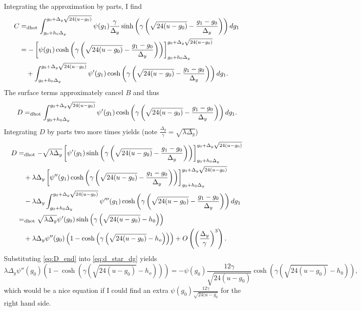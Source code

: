 \documentclass[twocolumn]{article}
\newcommand{\dhot}{=_{\text{dhot}}}
\begin{document}
Integrating the approximation by parts, I find
\begin{align*}
  C &\dhot \int_{\Lg}^{\Ug} \psi(g_1) \frac{\gamma}{\Delta_y}
  \sinh \left( \gamma \left(
      \sqrt{24(u-g_0)} - \frac{g_1 - g_0 }{ \Delta_y}
    \right) \right) dg_1 \\
  &= -\left[ \psi(g_1) \cosh \left( \gamma \left(
      \sqrt{24(u-g_0)} - \frac{g_1 - g_0 }{ \Delta_y}
    \right) \right)\right]_{\Lg}^{\Ug} \\
& \quad + \int_{\Lg}^{\Ug} \psi'(g_1) \cosh \left( \gamma \left(
      \sqrt{24(u-g_0)} - \frac{g_1 - g_0 }{ \Delta_y}
    \right) \right) dg_1.
\end{align*}
The surface terms approximately cancel $B$ and thus
\begin{equation*}
  D \dhot \int_{\Lg}^{\Ug} \psi'(g_1) \cosh \left( \gamma \left(
      \sqrt{24(u-g_0)} - \frac{g_1 - g_0 }{ \Delta_y}
    \right) \right) dg_1.
\end{equation*}
Integrating $D$ by parts two more times yields (note
$\frac{\Delta_y}{\gamma} = \sqrt{\lambda \Delta_y}$)
\begin{align}
  D &\dhot -\sqrt{\lambda \Delta_y} \left[ \psi'(g_1) \sinh \left(
      \gamma \left( \sqrt{24(u-g_0)} - \frac{g_1 - g_0 }{ \Delta_y}
      \right) \right)\right]_{\Lg}^{\Ug} \nonumber \\
& \quad +\lambda \Delta_y \left[ \psi''(g_1) \cosh \left( \gamma \left(
      \sqrt{24(u-g_0)} - \frac{g_1 - g_0 }{ \Delta_y}
    \right) \right)\right]_{\Lg}^{\Ug} \nonumber \\
& \quad - \lambda \Delta_y \int_{\Lg}^{\Ug} \psi'''(g_1) \cosh \left(
  \gamma \left( \sqrt{24(u-g_0)} - \frac{g_1 - g_0 }{ \Delta_y}
  \right) \right) dg_1 \nonumber \\
\label{eq:D_end}
&\dhot \sqrt{\lambda \Delta_y} \psi'(g_0) \sinh \left( \gamma
  \left( \sqrt{24(u-g_0)} - h_0 \right) \right) \\
& \quad +\lambda \Delta_y \psi''(g_0) \left( 1 - \cosh \left( \gamma \left(
      \sqrt{24(u-g_0)} - h_o \right) \right) \right) + O\left(
  \left( \frac{\Delta_y}{\gamma} \right)^3 \right). \nonumber
\end{align}
Substituting \eqref{eq:D_end} into \eqref{eq:d_star_dg} yields
\begin{equation}
  \label{eq:hope}
  \lambda \Delta_y \psi''(g_0) \left( 1 - \cosh \left( \gamma \left(
        \sqrt{24(u-g_0)} - h_o \right) \right) \right) = -\psi(g_0)
  \frac{12 \gamma}{\sqrt{24(u-g_0)}} \cosh\left( \gamma
    \left(\sqrt{24(u-g_0)} -h_0 \right) \right),
\end{equation}
which would be a nice equation if I could find an extra
$\psi(g_0)\frac{12\gamma}{\sqrt{24(u-g_0}}$ for the right hand side.
\end{document}
